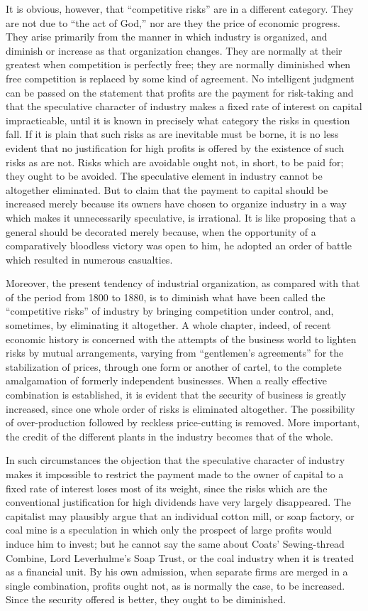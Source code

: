 \documentclass{book}
\begin{document}
It is obvious, however, that “competitive risks” are in a different category. They are not due to “the act of God,” nor are they the price of economic progress. They arise primarily from the manner in which industry is organized, and diminish or increase as that organization changes. They are normally at their greatest when competition is perfectly free; they are normally diminished when free competition is replaced by some kind of agreement. No intelligent judgment can be passed on the statement that profits are the payment for risk-taking and that the speculative character of industry makes a fixed rate of interest on capital impracticable, until it is known in precisely what category the risks in question fall. If it is plain that such risks as are inevitable must be borne, it is no less evident that no justification for high profits is offered by the existence of such risks as are not. Risks which are avoidable ought not, in short, to be paid for; they ought to be avoided. The speculative element in industry cannot be altogether eliminated. But to claim that the payment to capital should be increased merely because its owners have chosen to organize industry in a way which makes it unnecessarily speculative, is irrational. It is like proposing that a general should be decorated merely because, when the opportunity of a comparatively bloodless victory was open to him, he adopted an order of battle which resulted in numerous casualties.

Moreover, the present tendency of industrial organization, as compared with that of the period from 1800 to 1880, is to diminish what have been called the “competitive risks” of industry by bringing competition under control, and, sometimes, by eliminating it altogether. A whole chapter, indeed, of recent economic history is concerned with the attempts of the business world to lighten risks by mutual arrangements, varying from “gentlemen’s agreements” for the stabilization of prices, through one form or another of cartel, to the complete amalgamation of formerly independent businesses. When a really effective combination is established, it is evident that the security of business is greatly increased, since one whole order of risks is eliminated altogether. The possibility of over-production followed by reckless price-cutting is removed. More important, the credit of the different plants in the industry becomes that of the whole.

In such circumstances the objection that the speculative character of industry makes it impossible to restrict the payment made to the owner of capital to a fixed rate of interest loses most of its weight, since the risks which are the conventional justification for high dividends have very largely disappeared. The capitalist may plausibly argue that an individual cotton mill, or soap factory, or coal mine is a speculation in which only the prospect of large profits would induce him to invest; but he cannot say the same about Coats’ Sewing-thread Combine, Lord Leverhulme’s Soap Trust, or the coal industry when it is treated as a financial unit. By his own admission, when separate firms are merged in a single combination, profits ought not, as is normally the case, to be increased. Since the security offered is better, they ought to be diminished.
\end{document}
